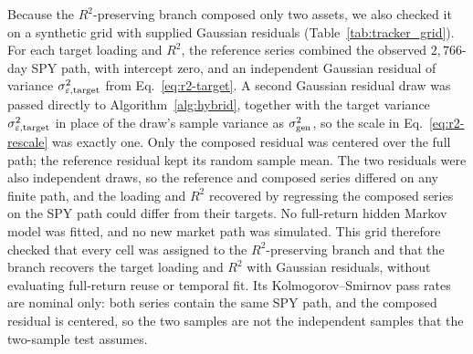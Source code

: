 Because the $R^2$-preserving branch composed only two assets, we also
checked it on a synthetic grid with supplied Gaussian residuals
(Table~\ref{tab:tracker_grid}). For each target loading and $R^2$, the
reference series combined the observed $2{,}766$-day SPY path, with
intercept zero, and an independent Gaussian residual of variance
$\sigma_{\varepsilon,\mathrm{target}}^2$ from Eq.~\eqref{eq:r2-target}. A
second Gaussian residual draw was passed directly to
Algorithm~\ref{alg:hybrid}, together with the target variance
$\sigma_{\varepsilon,\mathrm{target}}^2$ in place of the draw's sample
variance as $\sigma_{\mathrm{gen}}^2$, so the scale in
Eq.~\eqref{eq:r2-rescale} was exactly one. Only the composed residual
was centered over the full path; the reference residual kept its
random sample mean. The two residuals were also independent draws, so
the reference and composed series differed on any finite path, and
the loading and $R^2$ recovered by regressing the composed series on
the SPY path could differ from their targets. No full-return hidden
Markov model was fitted, and no new market path was simulated. This
grid therefore checked that every cell was assigned to the
$R^2$-preserving branch and that the branch recovers the target
loading and $R^2$ with Gaussian residuals, without evaluating
full-return reuse or temporal fit. Its Kolmogorov--Smirnov pass rates
are nominal only: both series contain the same SPY path, and the
composed residual is centered, so the two samples are not the
independent samples that the two-sample test assumes.

